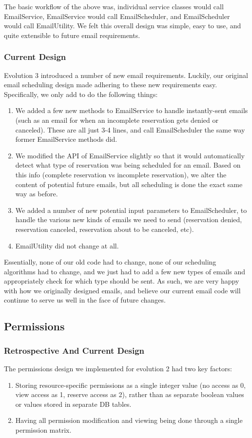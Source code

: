 \documentclass[12pt]{article}
\begin{document}
The basic workflow of the above was, individual service classes would call EmailService, EmailService would call EmailScheduler, and EmailScheduler would call EmailUtility. We felt this overall design was simple, easy to use, and quite extensible to future email requirements. 

\subsubsection{Current Design}
Evolution 3 introduced a number of new email requirements. Luckily, our original email scheduling design made adhering to these new requirements easy. Specifically, we only add to do the following things:
\begin{enumerate}
    \item We added a few new methods to EmailService to handle instantly-sent emails (such as an email for when an  incomplete reservation gets denied or canceled). These are all just 3-4 lines, and call EmailScheduler the same way former EmailService methods did. 
    \item We modified the API of EmailService slightly so that it would automatically detect what type of reservation was being scheduled for an email. Based on this info (complete reservation vs incomplete reservation), we alter the content of potential future emails, but all scheduling is done the exact same way as before. 
    \item We added a number of new potential input parameters to EmailScheduler, to handle the various new kinds of emails we need to send (reservation denied, reservation canceled, reservation about to be canceled, etc). 
    \item EmailUtility did not change at all. 
\end{enumerate}

Essentially, none of our old code had to change, none of our scheduling algorithms had to change, and we just had to add a few new types of emails and appropriately check for which type should be sent. As such, we are very happy with how we originally designed emails, and believe our current email code will continue to serve us well in the face of future changes. 


\subsection{Permissions}
\subsubsection{Retrospective And Current Design}
The permissions design we implemented for evolution 2 had two key factors:
\begin{enumerate}
    \item Storing resource-specific permissions as a single integer value (no access as 0, view access as 1, reserve access as 2), rather than as separate boolean values or values stored in separate DB tables. 
    \item Having all permission modification and viewing being done through a single permission matrix. 
\end{enumerate}
\end{document}
